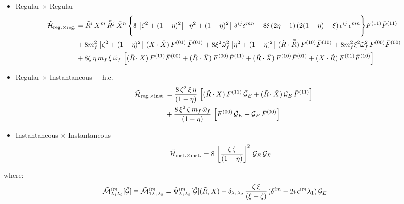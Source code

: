 \documentclass[9pt]{article}
\numberwithin{equation}{section}
\begin{document}
\begin{itemize}
    \item Regular $\times$ Regular
    \begin{align}
        \mathcal{\Tilde{H}}_{\mathrm{reg.}\times \mathrm{reg.}} & = \Tilde{R}^{i}\, X^{m}\, \Bar{\Tilde{R}}^{j}\,\Bar{X}^{n}\,\Bigg\{8\,\left[\zeta^{2} + (1-\eta)^{2}\right]\,\left[\eta^{2} + (1-\eta)^{2}\right]\,\delta^{ij}\delta^{mn}- 8\xi\, (2\eta -1)\,(2(1-\eta)-\xi)\,\epsilon^{ij}\,\epsilon^{mn}\Bigg\}F^{(11)}\Bar{F}^{(11)}\notag \\ & +8m^{2}_{f}\left[\zeta^{2} + (1-\eta)^{2}\right]\, (X\cdot \Bar{X})\,F^{(01)}\,\Bar{F}^{(01)} + 8\xi^{2}\Tilde{\omega}^{2}_{f}\left[\eta^{2}+(1-\eta)^{2}\right]\,(\Tilde{R}\cdot \Bar{\Tilde{R}})\,F^{(10)}\Bar{F}^{(10)} +8m^{2}_{f}\xi^{2}\Tilde{\omega}^{2}_{f}\,F^{(00)}\Bar{F}^{(00)}\notag \\ & +8\zeta\,\eta\, m_{f}\, \xi\, \Tilde{\omega}_{f}\, \left[(\Tilde{R}\cdot X)\, F^{(11)}\Bar{F}^{(00)} + (\Bar{\Tilde{R}}\cdot \Bar{X})\,F^{(00)}\Bar{F}^{(11)} + (\Tilde{R}\cdot \Bar{X})\,F^{(10)}\Bar{F}^{(01)} + (X\cdot \Bar{\Tilde{R}})\,F^{(01)}\Bar{F}^{(10)}\right]
    \end{align}
    \item Regular $\times$ Instantaneous $+$ h.c.
    \begin{align}
               \mathcal{\Tilde{H}}_{\mathrm{reg.}\times \mathrm{inst.}} & = \frac{8\,\zeta^{2}\,\xi\,\eta}{(1-\eta)}\,\left[(\Tilde{R}\cdot X)\,F^{(11)}\,\Bar{\mathcal{G}}_{E} + (\Bar{\Tilde{R}}\cdot \Bar{X})\,\mathcal{G}_{E}\,\Bar{F}^{(11)}\right]\notag \\ & + \frac{8\,\xi^{2}\,\zeta\,m_{f}\,\Tilde{\omega}_{f}}{(1-\eta)}\, \left[F^{(00)}\,\Bar{\mathcal{G}}_{E} + \mathcal{G}_{E}\,\Bar{F}^{(00)}\right]
    \end{align}
\item Instantaneous $\times$ Instantaneous
    \begin{align}
\mathcal{\Tilde{H}}_{\mathrm{inst.}\times \mathrm{inst.}} & = 8\, \left[\frac{\xi\,\zeta}{(1-\eta)}\right]^{2}\, \mathcal{G}_{E}\,\Bar{\mathcal{G}}_{E}
    \end{align}
\end{itemize}
where:
\begin{align}
\mathcal{\Tilde{M}}^{im}_{\lambda_{1}\lambda_{2}}[\mathcal{\Tilde{G}}] \equiv \mathcal{\Tilde{M}}^{im}_{1\lambda_{1}\lambda_{2}} &  = \Tilde{\Psi}^{im}_{\lambda_{1}\lambda_{2}}[\mathcal{\Tilde{G}}](\Tilde{R},X) - \delta_{\lambda_{1}\lambda_{2}}\,\frac{\zeta\,\xi}{(\xi + \zeta)}\,(\delta^{im}-2i\,\epsilon^{im}\lambda_{1})\,\mathcal{G}_{E} 
\end{align}
\end{document}
